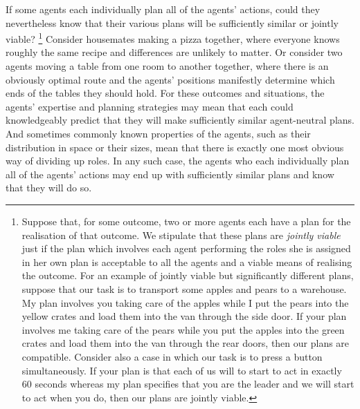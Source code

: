 \documentclass[12pt,\papersize]{extarticle}
\begin{document}
If some agents each individually plan all of the agents' actions, 
could they nevertheless know  that their various plans will be  sufficiently similar or jointly viable?%
\footnote{
\label{fn:df_jointly_viable}
Suppose that, for some outcome, two or more agents each have a plan for the realisation of that outcome. 
We stipulate that these plans are  \emph{jointly viable} just if
the plan which involves each agent performing the roles she is assigned in her own plan is acceptable to all the agents and a viable means of realising the outcome.
For an example of jointly viable but significantly different plans, suppose that our task is to transport some apples and pears to a warehouse. 
My plan involves you taking care of the apples while I put the pears into the yellow crates and load them into the van through the side door.
If your plan involves me taking care of the pears while you put the apples into the green crates and load them into the van through the rear doors, then our plans are compatible.
Consider also a case in which our task is to press a button simultaneously. 
If your plan is that each of us will to start to act in exactly 60 seconds whereas my plan specifies that you are the leader and we will start to act when you do, then our plans are jointly viable.
}
Consider housemates
	making a pizza together, where everyone knows roughly the same recipe and differences are unlikely to matter.
Or consider two agents 
 moving  a table from one room to another together, where there is an obviously optimal route and the agents' positions manifestly determine which ends of the tables they should hold.
For these outcomes and situations,
 the agents' expertise and planning strategies 
 may mean that each could knowledgeably predict that they will make sufficiently similar agent-neutral plans.
And sometimes commonly known properties of the agents, such as their distribution in space or their sizes, mean that there is exactly one most obvious way of dividing up roles.
In any such case, the agents who each individually plan all of the agents' actions may end up with sufficiently similar plans and know that they will do so.
\end{document}
